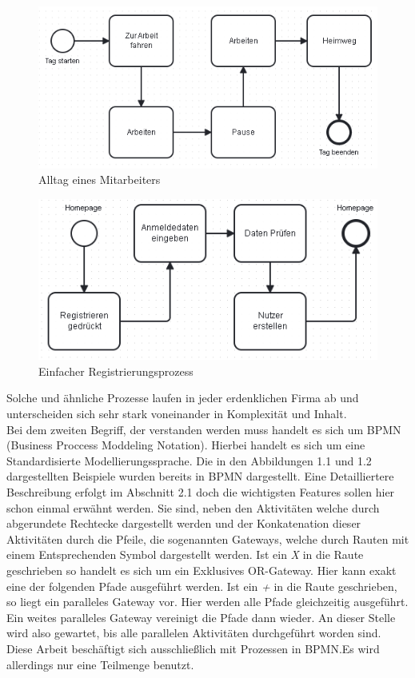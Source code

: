 \begin{figure}
\centering
\includegraphics[scale=0.7]{Figures/Einleitungbsp1}
\decoRule
\caption[Alltag eines Mitarbeiters]{Alltag eines Mitarbeiters}
\label{fig:Task}
\end{figure}\begin{figure}
\centering
\includegraphics[scale=0.7]{Figures/Einleitungbsp2}
\decoRule
\caption[Einfacher Registrierungsprozess]{Einfacher Registrierungsprozess}
\label{fig:Task}
\end{figure}Solche und ähnliche Prozesse laufen in jeder erdenklichen Firma ab und unterscheiden sich sehr stark voneinander in Komplexität und Inhalt.\\
Bei dem zweiten Begriff, der verstanden werden muss handelt es sich um BPMN (Business Proccess Moddeling Notation). Hierbei handelt es sich um eine Standardisierte Modellierungssprache. Die in den Abbildungen 1.1 und 1.2 dargestellten Beispiele wurden bereits in BPMN dargestellt. Eine Detailliertere Beschreibung erfolgt im Abschnitt 2.1 doch die wichtigsten Features sollen hier schon einmal erwähnt werden. Sie sind, neben den Aktivitäten welche durch abgerundete Rechtecke dargestellt werden und der Konkatenation dieser Aktivitäten durch die Pfeile, die sogenannten Gateways, welche durch Rauten mit einem Entsprechenden Symbol dargestellt werden. Ist ein \textit{X} in die Raute geschrieben so handelt es sich um ein Exklusives OR-Gateway. Hier kann exakt eine der folgenden Pfade ausgeführt werden. Ist ein \textit{+} in die Raute geschrieben, so liegt ein paralleles Gateway vor. Hier werden alle Pfade gleichzeitig ausgeführt. Ein weites paralleles Gateway vereinigt die Pfade dann wieder. An dieser Stelle wird also gewartet, bis alle parallelen Aktivitäten durchgeführt worden sind. Diese Arbeit beschäftigt sich ausschließlich mit Prozessen in BPMN.Es wird allerdings nur eine Teilmenge benutzt.\\
